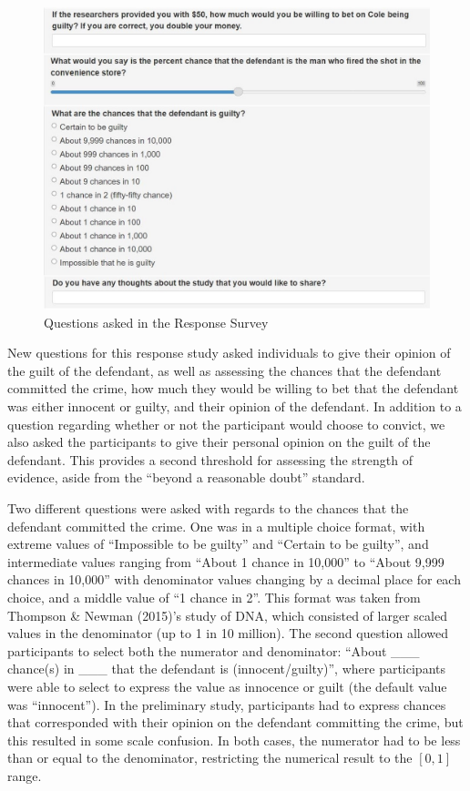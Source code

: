 \documentclass[print]{nuthesis}
\begin{document}
\begin{figure}

{\centering \includegraphics[width=1\linewidth]{images/study_questions2} 

}

\caption{Questions asked in the Response Survey}\label{fig:questions2}
\end{figure}

New questions for this response study asked individuals to give their opinion of the guilt of the defendant, as well as assessing the chances that the defendant committed the crime, how much they would be willing to bet that the defendant was either innocent or guilty, and their opinion of the defendant.
In addition to a question regarding whether or not the participant would choose to convict, we also asked the participants to give their personal opinion on the guilt of the defendant.
This provides a second threshold for assessing the strength of evidence, aside from the ``beyond a reasonable doubt'' standard.

Two different questions were asked with regards to the chances that the defendant committed the crime.
One was in a multiple choice format, with extreme values of ``Impossible to be guilty'' and ``Certain to be guilty'', and intermediate values ranging from ``About 1 chance in 10,000'' to ``About 9,999 chances in 10,000'' with denominator values changing by a decimal place for each choice, and a middle value of ``1 chance in 2''.
This format was taken from Thompson \& Newman (2015)'s study of DNA, which consisted of larger scaled values in the denominator (up to 1 in 10 million).
The second question allowed participants to select both the numerator and denominator: ``About \_\_\_ chance(s) in \_\_\_ that the defendant is (innocent/guilty)'', where participants were able to select to express the value as innocence or guilt (the default value was ``innocent'').
In the preliminary study, participants had to express chances that corresponded with their opinion on the defendant committing the crime, but this resulted in some scale confusion.
In both cases, the numerator had to be less than or equal to the denominator, restricting the numerical result to the \([0,1]\) range.
\end{document}
